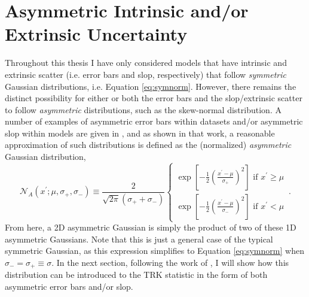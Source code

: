 \section{Asymmetric Intrinsic and/or Extrinsic Uncertainty}
\label{sec:asymm}
Throughout this thesis I have only considered models that have intrinsic and extrinsic scatter (i.e. error bars and slop, respectively) that follow \textit{symmetric} Gaussian distributions, i.e. Equation \eqref{eq:symnorm}. However, there remains the distinct possibility for either or both the error bars and the slop/extrinsic scatter to follow \textit{asymmetric} distributions, such as the skew-normal distribution. A number of examples of asymmetric error bars within datasets and/or asymmetric slop within models are given in \textcite{trotter}, and as shown in that work, a reasonable approximation of such distributions is defined as the (normalized) \textit{asymmetric} Gaussian distribution,
\begin{equation}
\label{eq:asymnorm}
\mathcal{N}_A(x^\prime;\mu,\sigma_{+},\sigma_-) \equiv \frac{2}{\sqrt{2\pi}(\sigma_{+} +\sigma_{-})} \left\{ \begin{array} {lr}
\exp{\left[-\frac{1}{2}\left(\frac{x^\prime-\mu}{\sigma_{+}}\right)^2\right]}\,\, \mbox{if $x^\prime\geq \mu$} \\
\exp{\left[-\frac{1}{2}\left(\frac{x^\prime-\mu}{\sigma_{-}}\right)^2\right]}\,\, \mbox{if $x^\prime < \mu$} \end{array} \right. \, .
\end{equation}
From here, a 2D asymmetric Gaussian is simply the product of two of these 1D asymmetric Gaussians. Note that this is just a general case of the typical symmetric Gaussian, as this expression simplifies to Equation \eqref{eq:symnorm} when $\sigma_-=\sigma_+\equiv\sigma$.
In the next section, following the work of \textcite{trotter}, I will show how this distribution can be introduced to the TRK statistic in the form of both asymmetric error bars and/or slop.

